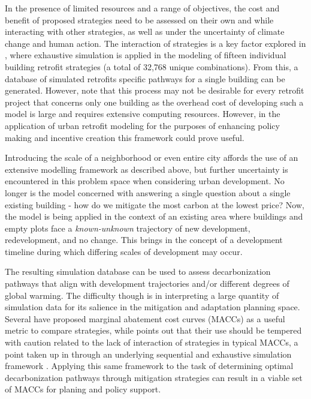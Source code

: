 \documentclass[twocolumn, a4paper,10pt]{article}
\begin{document}
In the presence of limited resources and a range of objectives, the cost and benefit of proposed strategies need to be assessed on their own and while interacting with other strategies, as well as under the uncertainty of climate change and human action. The interaction of strategies is a key factor explored in \citet{rysanek_using_2013}, where exhaustive simulation is applied in the modeling of fifteen individual building retrofit strategies (a total of 32,768 unique combinations). From this, a database of simulated retrofits specific pathways for a single building can be generated. However, \citet{rysanek_using_2013} note that this process may not be desirable for every retrofit project that concerns only one building as the overhead cost of developing such a model is large and requires extensive computing resources. However, in the application of urban retrofit modeling for the purposes of enhancing policy making and incentive creation this framework could prove useful.

Introducing the scale of a neighborhood or even entire city affords the use of an extensive modelling framework as described above, but further uncertainty is encountered in this problem space when considering urban development. No longer is the model concerned with answering a single question about a single existing building - how do we mitigate the most carbon at the lowest price? Now, the model is being applied in the context of an existing area where buildings and empty plots face a \textit{known-unknown} trajectory of new development, redevelopment, and no change. This brings in the concept of a development timeline during which differing scales of development may occur.

The resulting simulation database can be used to assess decarbonization pathways that align with development trajectories and/or different degrees of global warming. The difficulty though is in interpreting a large quantity of simulation data for its salience in the mitigation and adaptation planning space. Several have proposed marginal abatement cost curves (MACCs) as a useful metric to compare strategies, while \citet{kesicki_marginal_2012} points out that their use should be tempered with caution related to the lack of interaction of strategies in typical MACCs, a point taken up in \citet{rysanek_using_2013} through an underlying sequential and exhaustive simulation framework \citep{afshari_life-cycle_2014,ibrahim_methodology_2016}. Applying this same framework to the task of determining optimal decarbonization pathways through mitigation strategies can result in a viable set of MACCs for planing and policy support.
\end{document}
